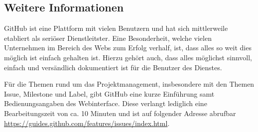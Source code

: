 \subsection{Weitere Informationen}
GitHub ist eine Plattform mit vielen Benutzern und hat sich mittlerweile
etabliert als seriöser Dienstleitster. Eine Besonderheit, welche vielen
Unternehmen im Bereich des Webs zum Erfolg verhalf, ist, dass alles so
weit dies möglich ist einfach gehalten ist. Hierzu gehört auch, dass alles
möglichst sinnvoll, einfach und versändlich dokumentiert ist für die
Benutzer des Dienstes. 

Für die Themen rund um das Projektmanagement, insbesondere mit den Themen
\gls{Issue}, \gls{Milestone} und \gls{Label}, gibt GitHub eine kurze
Einführung samt Bedienungsangaben des Webinterface. Diese verlangt lediglich
eine Bearbeitungszeit von ca. 10 Minuten und ist auf folgender Adresse
abrufbar \url{https://guides.github.com/features/issues/index.html}.

